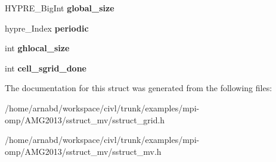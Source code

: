 \begin{DoxyCompactItemize}
\item 
\hypertarget{structhypre__SStructPGrid_a5e827f3844eb3ea23ed2581cb2392987}{}H\+Y\+P\+R\+E\+\_\+\+Big\+Int {\bfseries global\+\_\+size}\label{structhypre__SStructPGrid_a5e827f3844eb3ea23ed2581cb2392987}

\item 
\hypertarget{structhypre__SStructPGrid_a5974be7d269e1f8e456371f069eb4556}{}hypre\+\_\+\+Index {\bfseries periodic}\label{structhypre__SStructPGrid_a5974be7d269e1f8e456371f069eb4556}

\item 
\hypertarget{structhypre__SStructPGrid_a08bc93b1fc32ff62e2d9b4fd14501a6a}{}int {\bfseries ghlocal\+\_\+size}\label{structhypre__SStructPGrid_a08bc93b1fc32ff62e2d9b4fd14501a6a}

\item 
\hypertarget{structhypre__SStructPGrid_a4cc6280d27fa23ac345ed8edc5158e98}{}int {\bfseries cell\+\_\+sgrid\+\_\+done}\label{structhypre__SStructPGrid_a4cc6280d27fa23ac345ed8edc5158e98}

\end{DoxyCompactItemize}


The documentation for this struct was generated from the following files\+:\begin{DoxyCompactItemize}
\item 
/home/arnabd/workspace/civl/trunk/examples/mpi-\/omp/\+A\+M\+G2013/sstruct\+\_\+mv/sstruct\+\_\+grid.\+h\item 
/home/arnabd/workspace/civl/trunk/examples/mpi-\/omp/\+A\+M\+G2013/sstruct\+\_\+mv/sstruct\+\_\+mv.\+h\end{DoxyCompactItemize}
